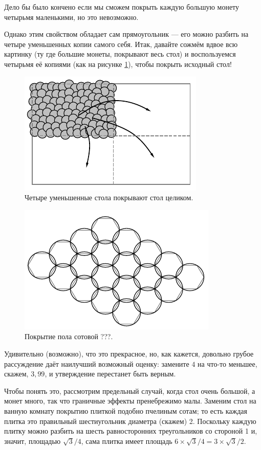 Дело бы было кончено если мы сможем покрыть каждую большую монету четырьмя маленькими,
но это невозможно.

Однако  этим свойством обладает сам прямоугольник --- его можно разбить на четыре уменьшенных копии самого себя.
Итак, давайте сожмём вдвое всю картинку (ту где большие монеты, покрывают весь стол) и воспользуемся четырьмя её копиями (как на рисунке \ref{pic:coin3}), чтобы покрыть исходный стол!


\begin{figure}[t!]
\centering
\includegraphics[scale=1]{pics/coin3}
\caption{Четыре уменьшенные стола покрывают стол целиком.}
\label{pic:coin3}
\end{figure}

\begin{figure}[b!]
\centering
\includegraphics[scale=1]{pics/coin4}
\caption{Покрытие пола  сотовой ???.}
\label{pic:coin4}
\end{figure}

Удивительно (возможно), что это прекрасное, но, как кажется, довольно грубое рассуждение даёт наилучший возможный оценку: замените $4$ на что-то меньшее, скажем, $3{,}99$, и утверждение перестанет быть верным.

Чтобы понять это, рассмотрим предельный случай, когда стол очень большой, а монет много, так что граничные эффекты пренебрежимо малы.
Заменим стол на ванную комнату покрытию плиткой подобно пчелиным сотам;
то есть каждая плитка это правильный шестиугольник диаметра (скажем) 2.
Поскольку каждую плитку можно разбить на шесть равносторонних треугольников со стороной 1 и, значит, площадью $\sqrt{3}/4$, сама плитка имеет площадь $6\times\sqrt{3}/4=3\times\sqrt{3}/2$.

